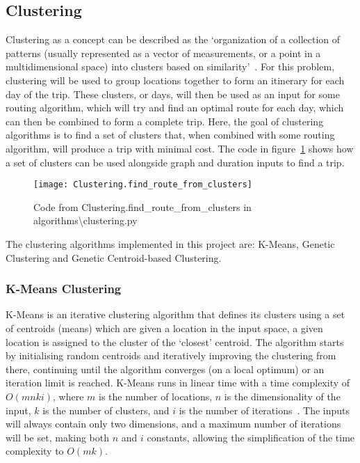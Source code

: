 \subsection{Clustering}\label{subsec:clustering}
Clustering as a concept can be described as the `organization of a collection of patterns (usually represented as a
vector of measurements, or a point in a multidimensional space) into clusters based on similarity'~\parencite[p. 265]{jain1999data}.
For this problem, clustering will be used to group locations together to form an itinerary for each day of the trip.
These clusters, or days, will then be used as an input for some routing algorithm, which will try and find an
optimal route for each day, which can then be combined to form a complete trip.
Here, the goal of clustering algorithms is to find a set of clusters that, when combined with some routing algorithm,
will produce a trip with minimal cost.
The code in figure~\ref{fig:Clustering.find_route_from_clusters} shows how a set of clusters can be used alongside
graph and duration inputs to find a trip.
\begin{figure}[H]
    \centering
    \texttt{[image: Clustering.find\_route\_from\_clusters]}
    \caption{Code from Clustering.find\_route\_from\_clusters in algorithms\textbackslash clustering.py}
    \label{fig:Clustering.find_route_from_clusters}
\end{figure}

\noindent
The clustering algorithms implemented in this project are: K-Means, Genetic Clustering and Genetic Centroid-based
Clustering.

\subsubsection{K-Means Clustering}\label{subsubsec:k-means}
K-Means is an iterative clustering algorithm that defines its clusters using a set of centroids (means) which are
given a location in the input space, a given location is assigned to the cluster of the `closest' centroid.
The algorithm starts by initialising random centroids and iteratively improving the clustering from there, continuing
until the algorithm converges (on a local optimum) or an iteration limit is reached.
K-Means runs in linear time with a time complexity of $O(m n k i)$, where $m$ is the number of locations, $n$ is the
dimensionality of the input, $k$ is the number of clusters, and $i$ is the number of iterations~\parencite[p. 102]{hartigan1979algorithm}.
The inputs will always contain only two dimensions, and a maximum number of iterations will be set, making both $n$ and
$i$ constants, allowing the simplification of the time complexity to $O(m k)$.\\

